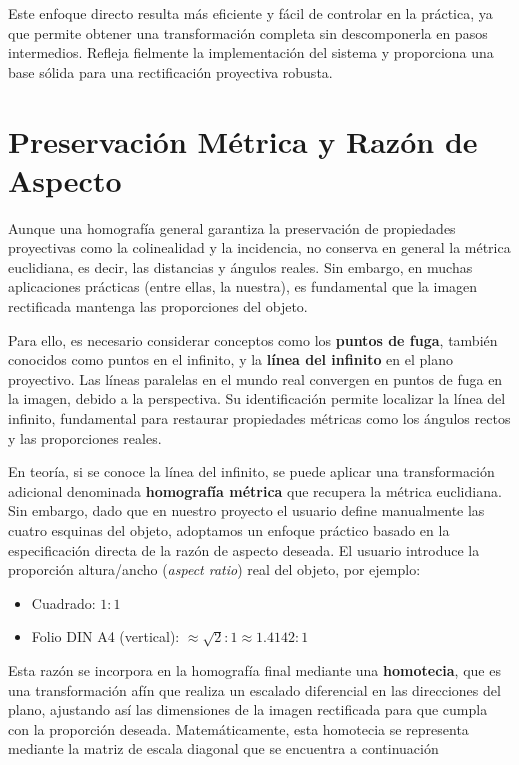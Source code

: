 Este enfoque directo resulta más eficiente y fácil de controlar en la práctica, ya que permite obtener una transformación completa sin descomponerla en pasos intermedios. Refleja fielmente la implementación del sistema y proporciona una base sólida para una rectificación proyectiva robusta.



\section{Preservación Métrica y Razón de Aspecto}

Aunque una homografía general garantiza la preservación de propiedades proyectivas como la colinealidad y la incidencia, no conserva en general la métrica euclidiana, es decir, las distancias y ángulos reales. Sin embargo, en muchas aplicaciones prácticas (entre ellas, la nuestra), es fundamental que la imagen rectificada mantenga las proporciones del objeto.

Para ello, es necesario considerar conceptos como los \textbf{puntos de fuga}, también conocidos como puntos en el infinito, y la \textbf{línea del infinito} en el plano proyectivo. Las líneas paralelas en el mundo real convergen en puntos de fuga en la imagen, debido a la perspectiva. Su identificación permite localizar la línea del infinito, fundamental para restaurar propiedades métricas como los ángulos rectos y las proporciones reales.

En teoría, si se conoce la línea del infinito, se puede aplicar una transformación adicional denominada \textbf{homografía métrica} que recupera la métrica euclidiana. Sin embargo, dado que en nuestro proyecto el usuario define manualmente las cuatro esquinas del objeto, adoptamos un enfoque práctico basado en la especificación directa de la razón de aspecto deseada. El usuario introduce la proporción altura/ancho (\textit{aspect ratio}) real del objeto, por ejemplo:

\begin{itemize}
    \item Cuadrado: \(1:1\)
    \item Folio DIN A4 (vertical): \(\approx \sqrt{2}:1 \approx 1.4142:1\)
\end{itemize}

Esta razón se incorpora en la homografía final mediante una \textbf{homotecia}, que es una transformación afín que realiza un escalado diferencial en las direcciones del plano, ajustando así las dimensiones de la imagen rectificada para que cumpla con la proporción deseada. Matemáticamente, esta homotecia se representa mediante la matriz de escala diagonal que se encuentra a continuación

